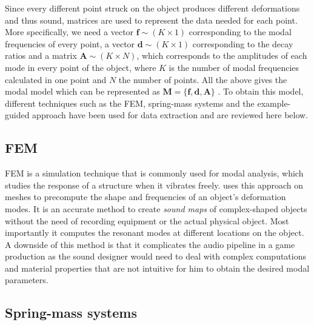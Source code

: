 Since every different point struck on the object produces different deformations and thus sound, matrices are used to represent the data needed for each point. More specifically, we need a vector $\textbf{f}\sim (K \times 1)$  corresponding to the modal frequencies of every point, a vector $\textbf{d}\sim (K \times 1)$ corresponding to the decay ratios and a matrix $\textbf{A}\sim (K \times N)$, which corresponds to the amplitudes of each mode in every point of the object, where $K$ is the number of modal frequencies calculated in one point and $N$ the number of points. All the above gives the modal model which can be represented as $\textbf{M} = \{\textbf{f}, \textbf{d}, \textbf{A}\}$ \cite{van2001foleyautomatic}. To obtain this model, different techniques such as the \gls{FEM}, spring-mass systems and the example-guided approach have been used for data extraction and are reviewed here below.


\subsection{FEM}\label{sec:fem}

\gls{FEM} is a simulation technique that is commonly used for modal analysis, which studies the response of a structure when it vibrates freely. \cite{o2002synthesizing} uses this approach on meshes to precompute the shape and frequencies of an object's deformation modes. It is an accurate method to create \textit{sound maps} of complex-shaped objects without the need of recording equipment or the actual physical object. Most importantly it computes the resonant modes at different locations on the object. A downside of this method is that it complicates the audio pipeline in a game production as the sound designer would need to deal with complex computations and material properties that are not intuitive for him to obtain the desired modal parameters.

\subsection{Spring-mass systems}\label{sec:springmass}

